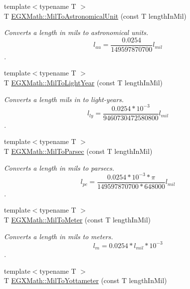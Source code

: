 \begin{DoxyCompactItemize}
\item 
{\footnotesize template$<$typename T $>$ }\\T \mbox{\hyperlink{group___e_g_x_math-_conversions-_length_conversions-_imperial-_mil-_astronomical_gaa7f4d37736c3265b5eb5ee9a16d91914}{E\+G\+X\+Math\+::\+Mil\+To\+Astronomical\+Unit}} (const T length\+In\+Mil)
\begin{DoxyCompactList}\small\item\em Converts a length in mils to astronomical units. \[ l_{au}=\frac{0.0254}{149597870700} l_{mil} \]. \end{DoxyCompactList}\item 
{\footnotesize template$<$typename T $>$ }\\T \mbox{\hyperlink{group___e_g_x_math-_conversions-_length_conversions-_imperial-_mil-_astronomical_ga5f6040b0b1a9aca71dbdfe79fc257b35}{E\+G\+X\+Math\+::\+Mil\+To\+Light\+Year}} (const T length\+In\+Mil)
\begin{DoxyCompactList}\small\item\em Converts a length mils in to light-\/years. \[ l_{ly}=\frac{0.0254 * 10^{-3}}{9460730472580800} l_{mil} \]. \end{DoxyCompactList}\item 
{\footnotesize template$<$typename T $>$ }\\T \mbox{\hyperlink{group___e_g_x_math-_conversions-_length_conversions-_imperial-_mil-_astronomical_gac188be8dcd6efe85bf8d39fe1f98c622}{E\+G\+X\+Math\+::\+Mil\+To\+Parsec}} (const T length\+In\+Mil)
\begin{DoxyCompactList}\small\item\em Converts a length in mils to parsecs. \[ l_{pc}=\frac{0.0254 * 10^{-3} * \pi}{149597870700 * 648000} l_{mil} \]. \end{DoxyCompactList}\item 
{\footnotesize template$<$typename T $>$ }\\T \mbox{\hyperlink{group___e_g_x_math-_conversions-_length_conversions-_imperial-_mil-_s_i_ga1ee4f51e99ac754f1849f933a661b07c}{E\+G\+X\+Math\+::\+Mil\+To\+Meter}} (const T length\+In\+Mil)
\begin{DoxyCompactList}\small\item\em Converts a length in mils to meters. \[ l_{m}=0.0254 * l_{mil} * 10^{-3} \]. \end{DoxyCompactList}\item 
{\footnotesize template$<$typename T $>$ }\\T \mbox{\hyperlink{group___e_g_x_math-_conversions-_length_conversions-_imperial-_mil-_s_i_gaa7be73e4efb8f962d8d7944cdeb842df}{E\+G\+X\+Math\+::\+Mil\+To\+Yottameter}} (const T length\+In\+Mil)

\end{DoxyCompactItemize}
